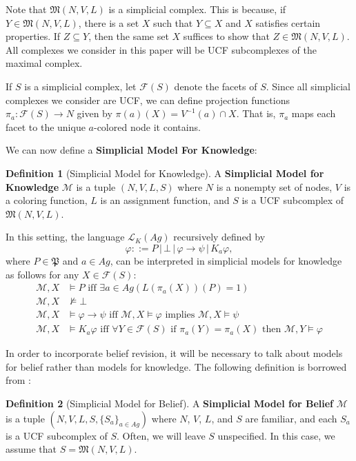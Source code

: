 \documentclass[11pt]{article}
\theoremstyle{definition}
\newtheorem{definition}{Definition}[section]
\newcommand{\M}{\mathcal{M}}
\newcommand{\defin}[1]{\textbf{#1}}
\renewcommand{\phi}{\varphi}
\newcommand{\lthen}{\rightarrow}
\newcommand{\F}{\mathcal{F}}
\renewcommand{\M}{\mathcal{M}}
\renewcommand{\L}{\mathcal{L}}
\begin{document}
	Note that $\mathfrak{M}(N,V,L)$ is a simplicial complex. This is because, if $Y\in \mathfrak{M}(N,V,L)$, there is a set $X$ such that $Y\subseteq X$ and $X$ satisfies certain properties. If $Z\subseteq Y$, then the same set $X$ suffices to show that $Z\in \mathfrak{M}(N,V,L)$. All complexes we consider in this paper will be UCF subcomplexes of the maximal complex. 
	
	If $S$ is a simplicial complex, let $\mathcal{F}(S)$ denote the facets of $S$. Since all simplicial complexes we consider are UCF, we can define projection functions $\pi_a:\mathcal{F}(S)\rightarrow N$ given by $\pi(a)(X)=V^{-1}(a)\cap X$. That is, $\pi_a$ maps each facet to the unique $a$-colored node it contains.
	
	We can now define a \defin{Simplicial Model For Knowledge}:
	
	\begin{definition}[Simplicial Model for Knowledge]
		A \defin{Simplicial Model for Knowledge} $\M$ is a tuple $(N,V,L,S)$ where $N$ is a nonempty set of nodes, $V$ is a coloring function, $L$ is an assignment function, and $S$ is a UCF subcomplex of $\mathfrak{M}(N,V,L)$.
	\end{definition}
	
	In this setting, the language $\L_{K}(Ag)$ recursively defined by
	$$\varphi ::= P \, | \, \bot \, | \, \phi \lthen \psi \, | \, K_{a}\phi,$$
	where $P \in \mathfrak{P}$ and $a \in Ag$, can be interpreted in simplicial models for knowledge as follows for any $X\in\F(S)$:
	\begin{align*}
		\M,X & \models P \text{ iff } \exists a\in Ag(L(\pi_a(X))(P)=1)\\
		\M,X & \nvDash \bot\\
		\M,X & \models \phi \lthen \psi \text{ iff } \M,X \models \phi \text{ implies } \M,X \models \psi\\
		\M,X & \models K_a \phi \text{ iff } \forall Y \in \F(S) \text{ if } \pi_a(Y) = \pi_a(X) \text{ then } \M,Y \models \phi
	\end{align*}
	
	In order to incorporate belief revision, it will be necessary to talk about models for belief rather than models for knowledge. The following definition is borrowed from \cite{SimpBelRev}:
	
	\begin{definition}[Simplicial Model for Belief]
		A \defin{Simplicial Model for Belief} $\M$ is a tuple $(N,V,L,S,\{S_a\}_{a\in Ag})$ where $N$, $V$, $L$, and $S$ are familiar, and each $S_a$ is a UCF subcomplex of $S$. Often, we will leave $S$ unspecified. In this case, we assume that $S=\mathfrak{M}(N,V,L)$.
	\end{definition}
	
\end{document}
